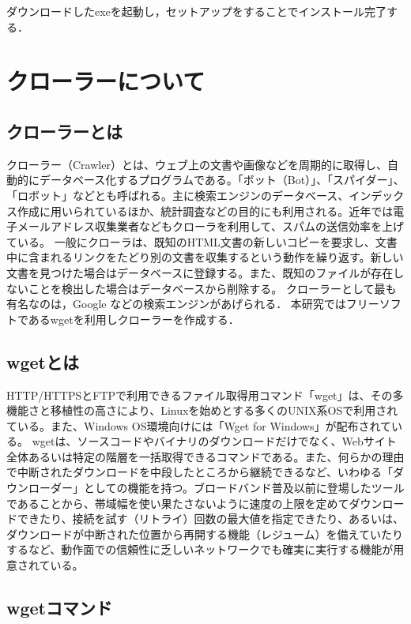 ダウンロードしたexeを起動し，セットアップをすることでインストール完了する．

\newpage
\section{クローラーについて}
\subsection{クローラーとは}
クローラー（Crawler）とは、ウェブ上の文書や画像などを周期的に取得し、自動的にデータベース化するプログラムである。「ボット（Bot）」、「スパイダー」、「ロボット」などとも呼ばれる。主に検索エンジンのデータベース、インデックス作成に用いられているほか、統計調査などの目的にも利用される。近年では電子メールアドレス収集業者などもクローラを利用して、スパムの送信効率を上げている。 
一般にクローラは、既知のHTML文書の新しいコピーを要求し、文書中に含まれるリンクをたどり別の文書を収集するという動作を繰り返す。新しい文書を見つけた場合はデータベースに登録する。また、既知のファイルが存在しないことを検出した場合はデータベースから削除する\cite{crawler}。 クローラーとして最も有名なのは，Google などの検索エンジンがあげられる．
本研究ではフリーソフトであるwgetを利用しクローラーを作成する．

\subsection{wgetとは}
HTTP/HTTPSとFTPで利用できるファイル取得用コマンド「wget」は、その多機能さと移植性の高さにより、Linuxを始めとする多くのUNIX系OSで利用されている。また、Windows OS環境向けには「Wget for Windows」が配布されている。
wgetは、ソースコードやバイナリのダウンロードだけでなく、Webサイト全体あるいは特定の階層を一括取得できるコマンドである。また、何らかの理由で中断されたダウンロードを中段したところから継続できるなど、いわゆる「ダウンローダー」としての機能を持つ。ブロードバンド普及以前に登場したツールであることから、帯域幅を使い果たさないように速度の上限を定めてダウンロードできたり、接続を試す（リトライ）回数の最大値を指定できたり、あるいは、ダウンロードが中断された位置から再開する機能（レジューム）を備えていたりするなど、動作面での信頼性に乏しいネットワークでも確実に実行する機能が用意されている。

\newpage

\subsection{wgetコマンド}

